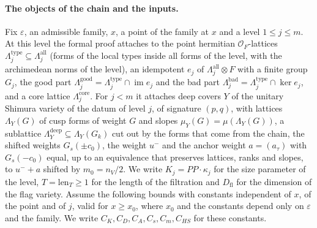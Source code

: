 \paragraph{The objects of the chain and the inputs.}
Fix $\varepsilon$, an admissible family, $x$, a point of the family at $x$ and a level $1\le j\le m$. At this level the formal proof attaches to the point hermitian $\mathcal O_F$-lattices $\Lambda^{\mathrm{type}}_j\subseteq\Lambda^{\mathrm{all}}_j$ (forms of the local types inside all forms of the level, with the archimedean norms of the level), an idempotent $e_j$ of $\Lambda^{\mathrm{all}}_j\otimes F$ with a finite group $G_j$, the good part $\Lambda^{\mathrm{good}}_j=\Lambda^{\mathrm{type}}_j\cap\operatorname{im}e_j$ and the bad part $\Lambda^{\mathrm{bad}}_j=\Lambda^{\mathrm{type}}_j\cap\ker e_j$, and a core lattice $\Lambda^{\mathrm{core}}_j$. For $j<m$ it attaches deep covers $Y$ of the unitary Shimura variety of the datum of level $j$, of signature $(p,q)$, with lattices $\Lambda_Y(G)$ of cusp forms of weight $G$ and slopes $\mu_Y(G)=\mu(\Lambda_Y(G))$, a sublattice $\Lambda^{\mathrm{deep}}_Y\subseteq\Lambda_Y(G_k)$ cut out by the forms that come from the chain, the shifted weights $G_s(\pm c_0)$, the weight $u^-$ and the anchor weight $a=(a_\tau)$ with $G_s(-c_0)$ equal, up to an equivalence that preserves lattices, ranks and slopes, to $u^-+a$ shifted by $m_0=n_V/2$. We write $K_j=PP\cdot\kappa_j$ for the size parameter of the level, $T=\mathrm{len}_T\ge1$ for the length of the filtration and $D_{\mathrm{fl}}$ for the dimension of the flag variety. Assume the following bounds with constants independent of $x$, of the point and of $j$, valid for $x\ge x_0$, where $x_0$ and the constants depend only on $\varepsilon$ and the family. We write $C_K,C_D,C_A,C_s,C_m,C_{HS}$ for these constants.
